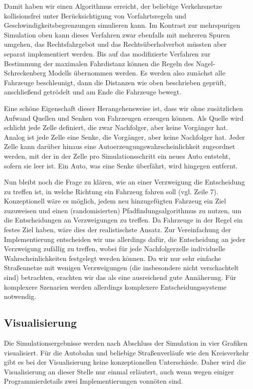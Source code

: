 \documentclass[10pt, a4paper]{article}
\begin{document}


Damit haben wir einen Algorithmus erreicht, der beliebige Verkehrsnetze kollisionsfrei unter Berück\-sichtigung von Vorfahrtsregeln und Geschwindigkeitsbegrenzungen simulieren kann. Im Kontrast zur mehrspurigen Simulation oben kann dieses Verfahren zwar ebenfalls mit mehreren Spuren umgehen, das Rechtsfahrgebot und das Rechtsüberholverbot müssten aber separat implementiert werden. Bis auf das modifizierte Verfahren zur Bestimmung der maximalen Fahrdistanz können die Regeln des Nagel-Schreckenberg Modells \cite{nagel-schreckenberg} übernommen werden. Es werden also zunächst alle Fahrzeuge beschleunigt, dann die Distanzen wie oben beschrieben geprüft, anschließend getrödelt und am Ende die Fahrzeuge bewegt.

Eine schöne Eigenschaft dieser Herangehensweise ist, dass wir ohne zusätzlichen Aufwand Quellen und Senken von Fahrzeugen erzeugen können. Als Quelle wird schlicht jede Zelle definiert, die zwar Nachfolger, aber keine Vorgänger hat. Analog ist jede Zelle eine Senke, die Vorgänger, aber keine Nachfolger hat. Jeder Zelle kann darüber hinaus eine Autoerzeugungswahrscheinlichkeit zugeordnet werden, mit der in der Zelle pro Simulationsschritt ein neues Auto entsteht, sofern sie leer ist. Ein Auto, was eine Senke überfährt, wird hingegen entfernt.

Nun bleibt noch die Frage zu klären, wie an einer Verzweigung die Entscheidung zu treffen ist, in welche Richtung ein Fahrzeug fahren soll (vgl. Zeile 7). Konzeptionell wäre es möglich, jedem neu hinzugefügten Fahrzeug ein Ziel zuzuweisen und einen (randomisierten) Pfadfindungsalgorithmus zu nutzen, um die Entscheidungen an Verzweigungen zu treffen. Da Fahrzeuge in der Regel ein festes Ziel haben, wäre dies der realistischste Ansatz. Zur Vereinfachung der Implementierung entscheiden wir uns allerdings dafür, die Entscheidung an jeder Verzweigung zufällig zu treffen, wobei für jede Nachfolgerzelle individuelle Wahrscheinlichkeiten festgelegt werden können. Da wir nur sehr einfache Straßennetze mit wenigen Verzweigungen (die insbesondere nicht verschachtelt sind) betrachten, erachten wir das als eine ausreichend gute Annäherung. Für komplexere Szenarien werden allerdings komplexere Entscheidungssysteme notwendig.

\subsection{Visualisierung}
\label{subsec:visualisierung}
Die Simulationsergebnisse werden nach Abschluss der Simulation in vier Grafiken visualisiert. Für die Autobahn und beliebige Straßenverläufe wie den Kreisverkehr gibt es bei der Visualisierung keine konzeptionellen Unterschiede. Daher wird die Visualisierung an dieser Stelle nur einmal erläutert, auch wenn wegen einiger Programmierdetails zwei Implementierungen vonnöten sind.
\end{document}
